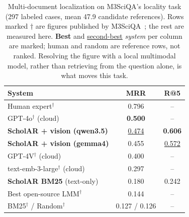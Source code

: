 \documentclass[letterpaper]{article} %
\newcommand{\best}[1]{\textbf{#1}}
\newcommand{\snd}[1]{\underline{#1}}
\begin{document}
\begin{table}[t]
  \centering
  \caption{Multi-document localization on M3SciQA's locality task (297 labeled cases, mean
           47.9 candidate references). Rows marked $\dagger$ are figures published by
           M3SciQA~\citep{li2024m3sciqa}; the rest are measured here. \best{Best} and
           \snd{second-best} \emph{system} per column are marked; human and random are reference
           rows, not ranked. Resolving the figure with a local multimodal model, rather than
           retrieving from the question alone, is what moves this task.}
  \label{tab:multidoc}
  \setlength{\tabcolsep}{2pt}
  \begin{tabular}{lcc}
    \toprule
    \textbf{System} & \textbf{MRR} & \textbf{R@5} \\
    \midrule
    Human expert$^\dagger$                    & 0.796 & -- \\
    GPT-4o$^\dagger$ (cloud)                  & \best{0.500} & -- \\
    \textbf{ScholAR + vision (qwen3.5)}       & \snd{0.474} & \best{0.606} \\
    \textbf{ScholAR + vision (gemma4)}        & 0.455 & \snd{0.572} \\
    GPT-4V$^\dagger$ (cloud)                  & 0.400 & -- \\
    text-emb-3-large$^\dagger$ (cloud)        & 0.297 & -- \\
    \textbf{ScholAR BM25} (text-only)         & 0.180 & 0.242 \\
    Best open-source LMM$^\dagger$            & 0.144 & -- \\
    BM25$^\dagger$ / Random$^\dagger$         & 0.127 / 0.126 & -- \\
    \bottomrule
  \end{tabular}
\end{table}
\end{document}
